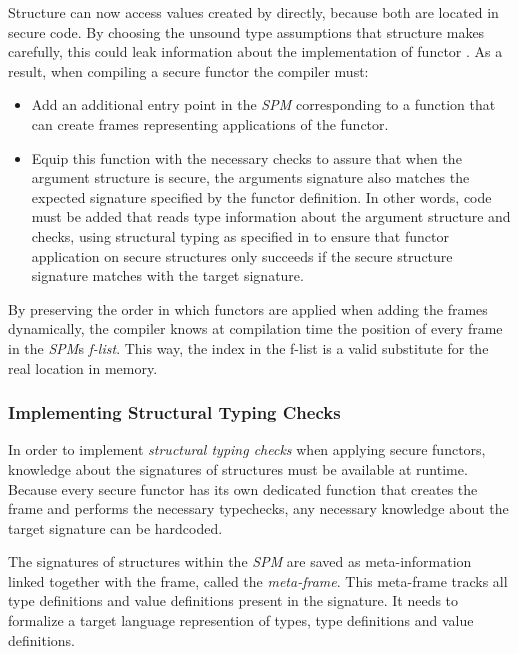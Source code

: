 \begin{description}
Structure  can now access values created by  directly, because both are located in secure code.
By choosing the unsound type assumptions that structure  makes carefully, this could leak information about the implementation of functor .
As a result, when compiling a secure functor the compiler must:
\begin{itemize}
\item Add an additional entry point in the \emph{SPM} corresponding to a function that can create frames representing applications of the functor.
\item Equip this function with the necessary checks to assure that when the argument structure is secure, the arguments signature also matches the expected signature specified by the functor definition.
In other words, code must be added that reads type information about the argument structure and checks, using structural typing as specified in  to ensure that functor application on secure structures only succeeds if the secure structure signature matches with the target signature.
\end{itemize}

By preserving the order in which functors are applied when adding the frames dynamically, the compiler knows at compilation time the position of every frame in the \emph{SPM}s \emph{f-list}.
This way, the index in the f-list is a valid substitute for the real location  in memory.
\end{description}

\subsubsection{Implementing Structural Typing Checks}
In order to implement \emph{structural typing checks} when applying secure functors, knowledge about the signatures of structures must be available at runtime.
Because every secure functor has its own dedicated function that creates the frame and performs the necessary typechecks, any necessary knowledge about the target signature can be hardcoded.

The signatures of structures within the \emph{SPM} are saved as meta-information linked together with the frame, called the \emph{meta-frame}.
This meta-frame tracks all type definitions and value definitions present in the signature.
It needs to formalize a target language represention of types, type definitions and value definitions.


